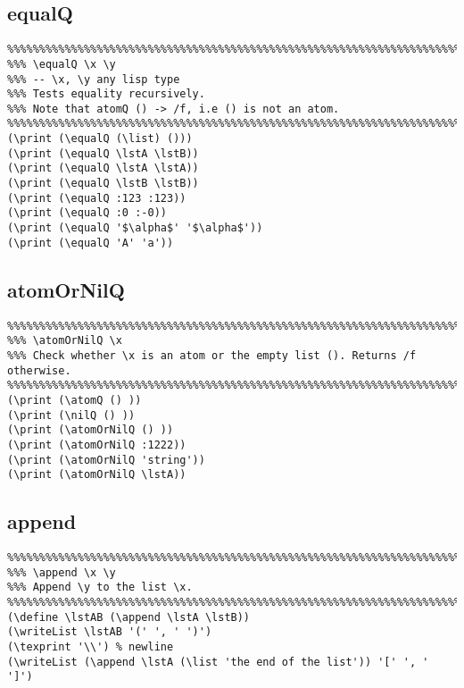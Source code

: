 \documentclass[10pt,a4paper]{article}
\begin{document}
\subsection{equalQ}
\begin{verbatim}
%%%%%%%%%%%%%%%%%%%%%%%%%%%%%%%%%%%%%%%%%%%%%%%%%%%%%%%%%%%%%%%%%%%%%%%%%%%%%
%%% \equalQ \x \y
%%% -- \x, \y any lisp type
%%% Tests equality recursively.
%%% Note that atomQ () -> /f, i.e () is not an atom.
%%%%%%%%%%%%%%%%%%%%%%%%%%%%%%%%%%%%%%%%%%%%%%%%%%%%%%%%%%%%%%%%%%%%%%%%%%%%%
(\print (\equalQ (\list) ()))
(\print (\equalQ \lstA \lstB))
(\print (\equalQ \lstA \lstA))
(\print (\equalQ \lstB \lstB))
(\print (\equalQ :123 :123))
(\print (\equalQ :0 :-0))
(\print (\equalQ '$\alpha$' '$\alpha$'))
(\print (\equalQ 'A' 'a'))
\end{verbatim}

\begin{framed}
\end{framed}

\subsection{atomOrNilQ}
\begin{verbatim}
%%%%%%%%%%%%%%%%%%%%%%%%%%%%%%%%%%%%%%%%%%%%%%%%%%%%%%%%%%%%%%%%%%%%%%%%%%%%%
%%% \atomOrNilQ \x
%%% Check whether \x is an atom or the empty list (). Returns /f otherwise.
%%%%%%%%%%%%%%%%%%%%%%%%%%%%%%%%%%%%%%%%%%%%%%%%%%%%%%%%%%%%%%%%%%%%%%%%%%%%%
(\print (\atomQ () ))
(\print (\nilQ () ))
(\print (\atomOrNilQ () ))
(\print (\atomOrNilQ :1222))
(\print (\atomOrNilQ 'string'))
(\print (\atomOrNilQ \lstA))
\end{verbatim}

\begin{framed}
\end{framed}

\subsection{append}
\begin{verbatim}
%%%%%%%%%%%%%%%%%%%%%%%%%%%%%%%%%%%%%%%%%%%%%%%%%%%%%%%%%%%%%%%%%%%%%%%%%%%%%
%%% \append \x \y
%%% Append \y to the list \x.
%%%%%%%%%%%%%%%%%%%%%%%%%%%%%%%%%%%%%%%%%%%%%%%%%%%%%%%%%%%%%%%%%%%%%%%%%%%%%
(\define \lstAB (\append \lstA \lstB))
(\writeList \lstAB '(' ', ' ')')
(\texprint '\\') % newline
(\writeList (\append \lstA (\list 'the end of the list')) '[' ', ' ']')
\end{verbatim}
\end{document}
